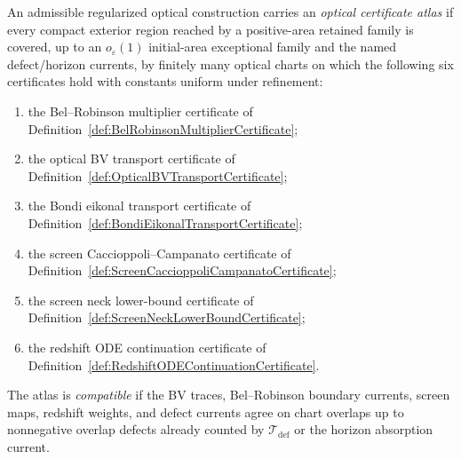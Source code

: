 \begin{definition}\label{def:OpticalCertificateAtlas}
An admissible regularized optical construction carries an \emph{optical certificate atlas} if every compact exterior region reached by a positive-area retained family is covered, up to an $o_\varepsilon(1)$ initial-area exceptional family and the named defect/horizon currents, by finitely many optical charts on which the following six certificates hold with constants uniform under refinement:
\begin{enumerate}
    \item the Bel--Robinson multiplier certificate of Definition~\ref{def:BelRobinsonMultiplierCertificate};
    \item the optical BV transport certificate of Definition~\ref{def:OpticalBVTransportCertificate};
    \item the Bondi eikonal transport certificate of Definition~\ref{def:BondiEikonalTransportCertificate};
    \item the screen Caccioppoli--Campanato certificate of Definition~\ref{def:ScreenCaccioppoliCampanatoCertificate};
    \item the screen neck lower-bound certificate of Definition~\ref{def:ScreenNeckLowerBoundCertificate};
    \item the redshift ODE continuation certificate of Definition~\ref{def:RedshiftODEContinuationCertificate}.
\end{enumerate}
The atlas is \emph{compatible} if the BV traces, Bel--Robinson boundary currents, screen maps, redshift weights, and defect currents agree on chart overlaps up to nonnegative overlap defects already counted by $\mathcal T_{\mathrm{def}}$ or the horizon absorption current.
\end{definition}

